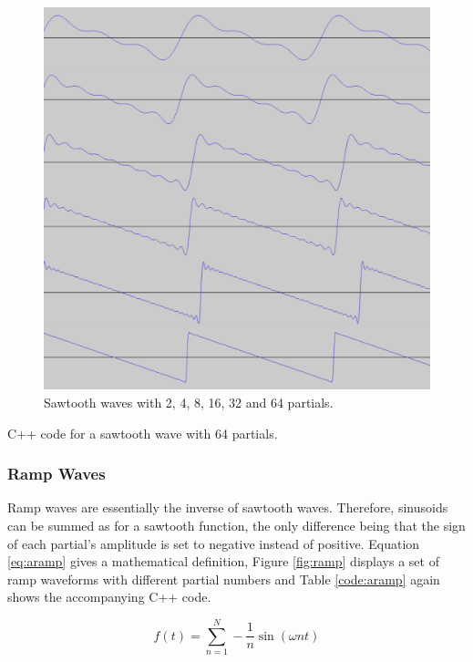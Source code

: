 \begin{figure}
  \includegraphics[scale=0.2]{img/saw}
  \caption{Sawtooth waves with 2, 4, 8, 16, 32 and 64 partials.}
  \label{fig:saw}
\end{figure}

\begin{table}
  \caption{C++ code for a sawtooth wave with 64 partials.}
  \label{code:asaw}
\end{table}

\pagebreak

\subsubsection{Ramp Waves}

Ramp waves are essentially the inverse of sawtooth waves. Therefore, sinusoids can be summed as for a sawtooth function, the only difference being that the sign of each partial's amplitude is set to negative instead of positive. Equation \ref{eq:aramp} gives a mathematical definition, Figure \ref{fig:ramp} displays a set of ramp waveforms with different partial numbers and Table \ref{code:aramp} again shows the accompanying C++ code.

\begin{equation}
  f(t) = \sum\limits_{n=1}^N -\frac{1}{n} \sin(\omega n t)
  \label{eq:aramp}
\end{equation}

